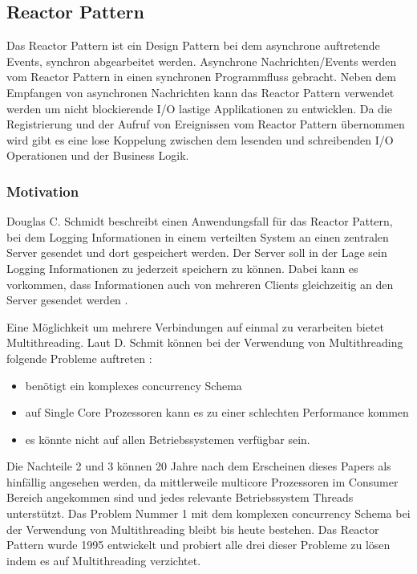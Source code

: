 \subsection{Reactor Pattern}
\label{section:Reactor Pattern}

Das Reactor Pattern ist ein Design Pattern bei dem asynchrone auftretende Events, synchron abgearbeitet werden. Asynchrone Nachrichten/Events werden vom Reactor Pattern in einen synchronen Programmfluss gebracht. Neben dem Empfangen von asynchronen Nachrichten kann das Reactor Pattern verwendet werden um nicht blockierende I/O lastige Applikationen zu entwicklen. Da die Registrierung und der Aufruf von Ereignissen vom Reactor Pattern übernommen wird gibt es eine lose Koppelung zwischen dem lesenden und schreibenden I/O Operationen und der Business Logik. \cite[p. 1]{Sch95}

\subsubsection{Motivation}
\label{section:reactor_motivation}

Douglas C. Schmidt beschreibt einen Anwendungsfall für das Reactor Pattern, bei dem Logging Informationen in einem verteilten System an einen zentralen Server gesendet und dort gespeichert werden. Der Server soll in der Lage sein Logging Informationen zu jederzeit speichern zu können. Dabei kann es vorkommen, dass Informationen auch von mehreren Clients gleichzeitig an den Server gesendet werden \cite[p. 1]{Sch95}. 

Eine Möglichkeit um mehrere Verbindungen auf einmal zu verarbeiten bietet Multithreading. Laut D. Schmit können bei der Verwendung von Multithreading folgende Probleme auftreten \cite[p. 1]{Sch95}: 

\begin{itemize}
  \item benötigt ein komplexes concurrency Schema
  \item auf Single Core Prozessoren kann es zu einer schlechten Performance kommen
  \item es könnte nicht auf allen Betriebssystemen verfügbar sein.
\end{itemize}

Die Nachteile 2 und 3 können 20 Jahre nach dem Erscheinen dieses Papers als hinfällig angesehen werden, da mittlerweile multicore Prozessoren im Consumer Bereich angekommen sind und jedes relevante Betriebssystem Threads unterstützt. Das Problem Nummer 1 mit dem komplexen concurrency Schema bei der Verwendung von Multithreading bleibt bis heute bestehen. Das Reactor Pattern wurde 1995 entwickelt und probiert alle drei dieser Probleme zu lösen indem es auf Multithreading verzichtet.

